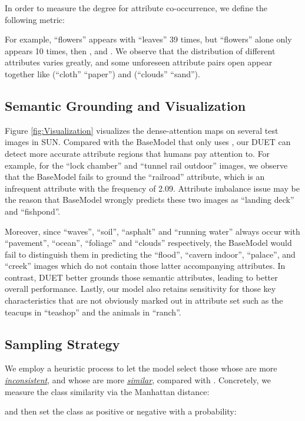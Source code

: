 \documentclass[letterpaper]{article} \usepackage{aaai23}  \usepackage{times}  \usepackage{helvet}  \usepackage{courier}  \usepackage[hyphens]{url}  \usepackage{graphicx} \urlstyle{rm} \def\UrlFont{\rm}  \usepackage{natbib}  \usepackage{caption} \frenchspacing  \setlength{\pdfpagewidth}{8.5in}  \setlength{\pdfpageheight}{11in}  \usepackage{algorithm}
\begin{document}
In order to measure the degree for attribute co-occurrence, 
we define {the following metric:}

For example, ``flowers'' appears with ``leaves'' 39 times, but ``flowers'' alone only appears 10 times, then   , and     .
We observe that the distribution of different attributes varies greatly, and some unforeseen attribute pairs open appear together like (``cloth''  ``paper'') and (``clouds'' ``sand'').

\subsection{Semantic Grounding and Visualization}

Figure \ref{fig:Visualization} visualizes the dense-attention maps on several test images {in SUN.}
Compared with the BaseModel that only use{s} , our DUET can detect more accurate attribute regions that humans pay 
attention to.
{For example,}
for the ``lock chamber'' and ``tunnel rail outdoor'' images, we observe that the BaseModel fail{s} to ground the ``railroad'' attribute, 
which is an infrequent attribute {with the frequency of 2.09.}
Attribute imbalance issue may be the reason {that} BaseModel {wrongly predicts} these {two images} as ``landing deck'' and ``fishpond''.

Moreover, 
since ``waves'',  ``soil'',  ``asphalt'' and ``running water''
always occur with ``pavement'', ``ocean'', ``foliage'' and ``clouds'' respectively, 
the BaseModel {would fail to distinguish them in predicting} 
the ``flood'', ``cavern indoor'', ``palace'', and ``creek'' images which {do not} contain those latter accompanying attributes.
{In contrast, DUET better  grounds those semantic attributes, leading to better overall performance.}
Lastly, our model also retains sensitivity for those key characteristics that are not obviously marked out in attribute set such as the teacups in ``teashop'' and the animals in ``ranch''.

\subsection{Sampling Strategy}
We employ a heuristic process to let the model 
select those  whose  are more \ul{\emph{inconsistent}}, and   whose  are more \ul{\emph{similar}}, compared with . 
Concretely, we measure the class similarity via 
the Manhattan distance:

and then {set the}
class   as positive or negative with {a} 
probability:
\end{document}
